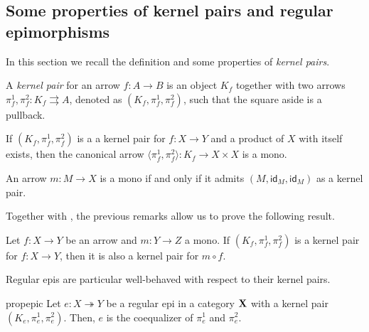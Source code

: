 \documentclass[3p]{elsarticle}
\def\X{\textbf {\textup{X}}}
\newcommand{\eto}{\twoheadrightarrow}
\newcommand{\id}[1]{\mathsf{id}_{#1}}
\theoremstyle{remark}
\theoremstyle{definition}
\begin{document}
\subsection{Some properties of kernel pairs and regular epimorphisms}

In this section we recall the definition and some properties of \emph{kernel pairs}.

\noindent 
\begin{minipage}[l]{.85\linewidth}
\begin{defi} A \emph{kernel pair} for an arrow $f\colon A \to B$ is an object $K_f$ together with two arrows $\pi^1_f, \pi^2_f\colon K_f \rightrightarrows A$, denoted as $(K_f, \pi^1_f, \pi^2_f)$, such that the square aside is a pullback.
\end{defi}
\end{minipage} \hfill 
\begin{minipage}[r]{.18\linewidth}
\end{minipage} 

\begin{rem}\label{prop:pairng_of_kernel_pairs_mono}
If $(K_f, \pi^1_f, \pi^2_f)$ is a a kernel pair for $f\colon X \to Y$ and a product of $X$ with itself exists, then the canonical arrow $\langle \pi^1_f, \pi^2_f\rangle \colon K_f \to X \times X$ is a mono.
\end{rem}

\begin{rem}\label{prop:kermono}
An arrow $m\colon M\to X$ is a mono if and only if it admits $(M, \id{M}, \id{M})$ as a kernel pair.
\end{rem}

Together with , the previous remarks allow us to prove the following result.

\begin{prop}\label{cor:kermono}
	Let $f\colon X\to Y$ be an arrow and $m\colon Y\to Z$ a mono. If
	$(K_f, \pi_f^1, \pi_f^2)$ is a kernel pair for $f\colon X\to Y$, then it is also a kernel pair for $m\circ f$.
\end{prop}

Regular epis are particular well-behaved with respect to their kernel pairs.

\begin{restatable}{prop}{epic}\label{prop:reg_epi_coeq}
    Let $e\colon X \eto Y$ be a regular epi in a category $\X$ with a kernel pair $(K_e, \pi^1_e, \pi^2_e)$. Then, $e$ is the coequalizer of $\pi^1_e$ and $\pi^2_e$.
\end{restatable}
\end{document}
